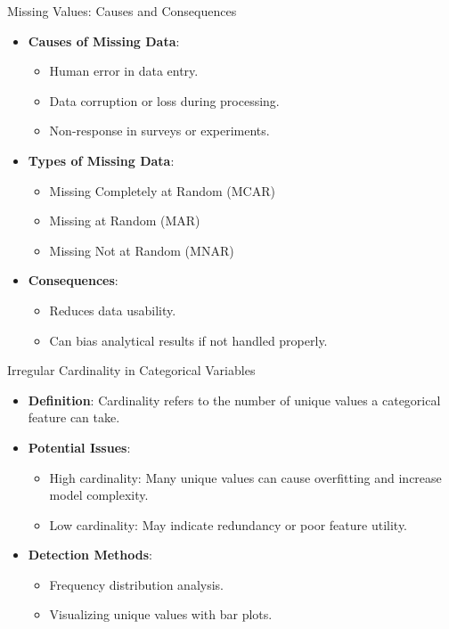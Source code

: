 \documentclass[aspectratio=169,xcolor=dvipsnames]{beamer}
\begin{document}
\begin{frame}{Missing Values: Causes and Consequences}
\begin{itemize}
    \setlength\itemsep{0.25cm}
    \item \textbf{Causes of Missing Data}:
    \begin{itemize}
        \item Human error in data entry.
        \item Data corruption or loss during processing.
        \item Non-response in surveys or experiments.
    \end{itemize}
    \item \textbf{Types of Missing Data}:
    \begin{itemize}
        \item Missing Completely at Random (MCAR)
        \item Missing at Random (MAR)
        \item Missing Not at Random (MNAR)
    \end{itemize}
    \item \textbf{Consequences}:
    \begin{itemize}
        \item Reduces data usability.
        \item Can bias analytical results if not handled properly.
    \end{itemize}
\end{itemize}
\end{frame}

\begin{frame}{Irregular Cardinality in Categorical Variables}
\begin{itemize}
    \setlength\itemsep{0.25cm}
    \item \textbf{Definition}: Cardinality refers to the number of unique values a categorical feature can take.
    \item \textbf{Potential Issues}:
    \begin{itemize}
        \item High cardinality: Many unique values can cause overfitting and increase model complexity.
        \item Low cardinality: May indicate redundancy or poor feature utility.
    \end{itemize}
    \item \textbf{Detection Methods}:
    \begin{itemize}
        \item Frequency distribution analysis.
        \item Visualizing unique values with bar plots.
    \end{itemize}

\end{itemize}
\end{frame}
\end{document}
